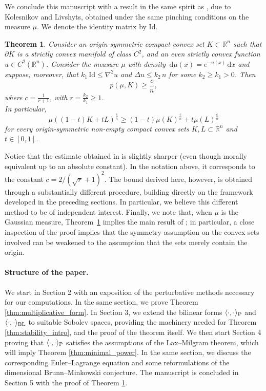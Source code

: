 \documentclass[a4paper, 11pt]{article}
\newcommand{\R}{\mathbb{R}}
\newcommand{\Id}{\mathrm{Id}}
\newtheorem{theorem}{Theorem}[section]
\theoremstyle{definition}
\newcommand{\di}{\, \mathrm{d}}
\begin{document}
We conclude this manuscript with a result in the same spirit as \cite[Theorem~1.1]{Kol_Liv_Gardner-Zvavitch}, due to Kolesnikov and Livshyts, obtained under the same pinching conditions on the measure $\mu$. We denote the  identity matrix by $\Id$.
\begin{theorem}\label{thm:SG_intro}
Consider an origin-symmetric compact convex set $K \subset \R^n$ such that $\partial K$ is a strictly convex manifold of class $C^2$, and an even strictly convex function $u \in C^2(\R^n)$. Consider the measure $\mu$ with density $\di \mu(x) = e^{-u(x)}\di x$ and suppose, moreover, that $k_{1}\,\mathrm{Id} \leq \nabla^{2}u$ and $ \Delta u \leq k_{2}\,n$ for some $k_2\geq k_1 >0$.  Then
\[  p(\mu,K) \geq \frac{c}{n},\]
where $c=\frac{1}{r+1}$, with $r=\frac{k_{2}}{k_{1}}\geq 1$. \\
In particular, 
\[ \mu((1-t)K+tL)^{\frac{c}{n}}\geq (1-t)\mu(K)^{\frac{c}{n}}+t\mu(L)^{\frac{c}{n}}\] for every origin-symmetric non-empty compact convex sets $K, L \subset \R^n$ and $t \in [0,1]$.
\end{theorem}\noindent
Notice that the estimate obtained in \cite{Kol_Liv_Gardner-Zvavitch} is slightly sharper (even though morally equivalent up to an absolute constant). In the notation above, it corresponds to the constant $c=2/(\sqrt{r}+1)^2$. The bound derived here, however, is obtained through a substantially different procedure, building directly on the framework developed in the preceding sections. In particular, we believe this different method to be of independent interest. Finally, we note that, when $\mu$ is the Gaussian measure, Theorem~\ref{thm:SG_intro} implies the main result of \cite{Kol_Liv_Gardner-Zvavitch}; in particular, a close inspection of the proof implies that the symmetry assumption on the convex sets involved can be weakened to the assumption that the sets merely contain the origin.

\paragraph{Structure of the paper.} 

We start in Section 2 with an exposition of the perturbative methods necessary for our computations. In the same section, we prove Theorem \ref{thm:multiplicative_form}. In Section 3, we extend the bilinear forms $\langle\cdot,\cdot \rangle_{\rm P}$ and $\langle\cdot,\cdot \rangle_{\rm BL}$ to suitable Sobolev spaces, providing the machinery needed for Theorem \ref{thm:stability_intro}, and the proof of the theorem itself. We then start Section 4 proving that $\langle\cdot,\cdot \rangle_{\rm P}$ satisfies the assumptions of the Lax--Milgram theorem, which will imply Theorem \ref{thm:minimal_power}. In the same section, we discuss the corresponding Euler--Lagrange equation and some reformulations of the dimensional Brunn--Minkowski conjecture. The manuscript is concluded in Section 5 with the proof of Theorem \ref{thm:SG_intro}.
\end{document}

